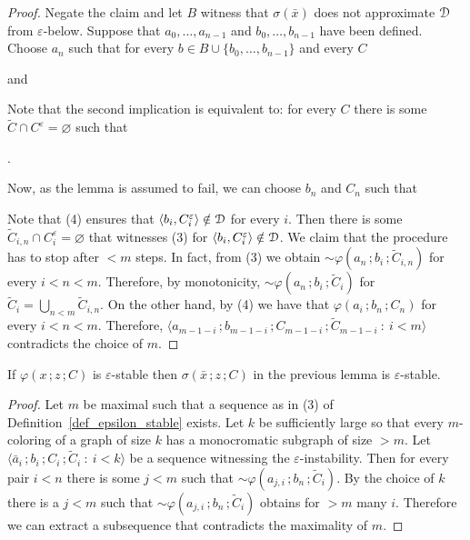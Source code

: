 \begin{proof}
  Negate the claim and let $B$ witness that $\sigma(\bar x)$ does not approximate ${\EuScript D}$ from $\varepsilon$-below.
  Suppose that $a_0,\dots,a_{n-1}$ and $b_0,\dots,b_{n-1}$ have been defined.
  Choose $a_n$ such that for every $b\in B\cup\{b_0,\dots,b_{n-1}\}$ and every $C$

  \quad and

  
  Note that the second implication is equivalent to: for every $C$ there is some  $\tilde C\cap C^\varepsilon=\varnothing$ such that 
  
  .%

  Now, as the lemma is assumed to fail, we can choose $b_n$ and $C_n$ such that


  Note that (4) ensures that $\langle b_i,C_i^\varepsilon\rangle\notin{\EuScript D}$ for every $i$.
  Then there is some $\tilde C_{i,n}\cap C^\varepsilon_i=\varnothing$ that witnesses (3) for $\langle b_i,C_i^\varepsilon\rangle\notin{\EuScript D}$.
  We claim that the procedure has to stop after $< m$ steps. 
  In fact, from (3) we obtain ${\sim}\varphi(a_n\,;b_i\,;\tilde C_{i,n})$ for every $i<n<m$.
  Therefore, by monotonicity, ${\sim}\varphi(a_n\,;b_i\,;\tilde C_i)$ for $\tilde C_i=\bigcup_{n< m}\tilde C_{i,n}$.
  On the other hand, by (4) we have that $\varphi(a_i\,;b_n\,;C_n)$ for every $i<n<m$.
  Therefore, $\langle a_{m-1-i}\,;b_{m-1-i}\,;C_{m-1-i}\,;\tilde C_{m-1-i}\ :\ i< m\rangle$ contradicts the choice of $m$.
\end{proof}

\begin{lemma}\label{lem_sigma_stable}
  If $\varphi(x\,;z\,;C)$ is $\varepsilon$-stable then $\sigma(\bar x\,;z\,;C)$ in the previous lemma is $\varepsilon$-stable.
\end{lemma}

\begin{proof}
  Let $m$ be maximal such that a sequence as in (3) of Definition~\ref{def_epsilon_stable} exists.
  Let $k$ be sufficiently large so that every $m$-coloring of a graph of size $k$ has a monocromatic subgraph of size $>m$.
  Let $\langle \bar a_i\,;b_i\,;C_i\,;\tilde C_i\ :\ i<k\rangle$ be a sequence witnessing the $\varepsilon$-instability.
  Then for every pair $i<n$ there is some $j<m$ such that ${\sim}\varphi(a_{j,i}\,;b_n\,;\tilde C_i)$.
  By the choice of $k$ there is a $j<m$ such that ${\sim}\varphi(a_{j,i}\,;b_n\,;\tilde C_i)$ obtains for $>m$ many $i$.
  Therefore we can extract a subsequence that contradicts the maximality of $m$.
\end{proof}
